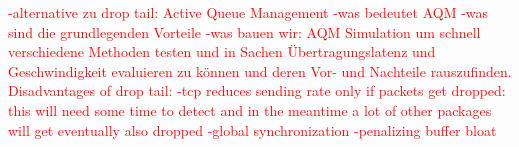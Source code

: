 \textcolor{red}{-alternative zu drop tail: Active Queue Management
-was bedeutet AQM
-was sind die grundlegenden Vorteile
-was bauen wir: AQM Simulation um schnell verschiedene Methoden testen und in Sachen Übertragungslatenz und Geschwindigkeit evaluieren zu können und deren Vor- und Nachteile rauszufinden.
Disadvantages of drop tail:\newline
-tcp reduces sending rate only if packets get dropped: this will need some time to detect and in the meantime a lot of other packages will get eventually also dropped
-global synchronization
-penalizing buffer bloat}

 


